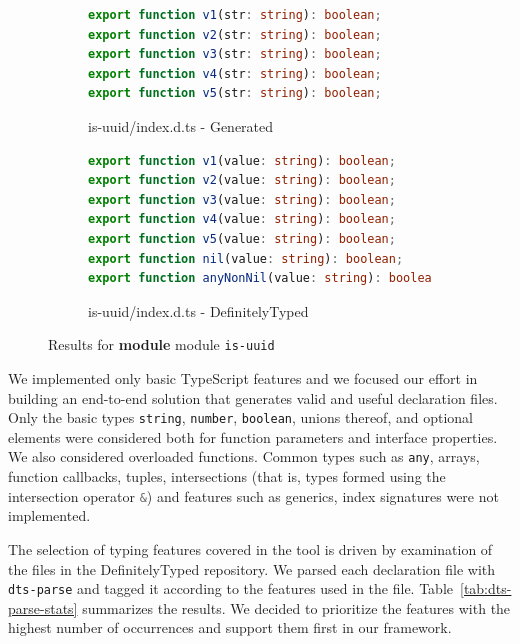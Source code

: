 \documentclass[english,cleveref,autoref,submission]{programming}
\begin{document}
\begin{figure}[tp]
  \centering
  \begin{subfigure}{0.48\linewidth}
    \begin{lstlisting}[language=TypeScript,numbers=none]
export function v1(str: string): boolean;
export function v2(str: string): boolean;
export function v3(str: string): boolean;
export function v4(str: string): boolean;
export function v5(str: string): boolean;
    \end{lstlisting}
    \caption{is-uuid/index.d.ts - Generated}
  \end{subfigure}
  \hfill
  \begin{subfigure}{0.48\linewidth}
    \begin{lstlisting}[language=TypeScript,numbers=none]
export function v1(value: string): boolean;
export function v2(value: string): boolean;
export function v3(value: string): boolean;
export function v4(value: string): boolean;
export function v5(value: string): boolean;
export function nil(value: string): boolean;
export function anyNonNil(value: string): boolean;
    \end{lstlisting}
    \caption{is-uuid/index.d.ts - DefinitelyTyped}
  \end{subfigure}

  \caption{Results for \textbf{module}  module \texttt{is-uuid}}
  \label{fig:experiments-results-module-is-uuid}
\end{figure}

We implemented only basic TypeScript features and we focused our effort in building an
end-to-end solution that generates valid and useful declaration files. Only the basic
types \texttt{string}, \texttt{number}, \texttt{boolean}, unions
thereof, and optional elements were considered
both for function parameters and interface properties. We also
considered overloaded functions.
Common types such as
\texttt{any}, arrays, function callbacks, tuples, intersections (that
is, types formed using the intersection operator \lstinline[language=TypeScript]/&/) and features such as
generics, index signatures were not implemented.

The selection of typing features covered in the tool is driven by
examination of the files in
the DefinitelyTyped repository. We parsed each declaration file with
\texttt{dts-parse} and tagged it according to the features used in the file.
Table~\ref{tab:dts-parse-stats} summarizes the results.
We decided to prioritize the features with the highest number of
occurrences and support them first in our framework.
\end{document}
